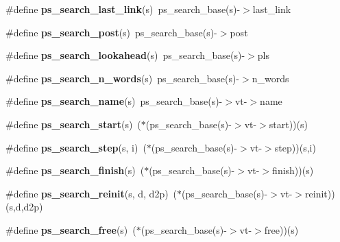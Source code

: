 \begin{DoxyCompactItemize}
\item 
\#define {\bfseries ps\+\_\+search\+\_\+last\+\_\+link}(s)~ps\+\_\+search\+\_\+base(s)-\/$>$last\+\_\+link\label{pocketsphinx__internal_8h_a9ae7d942e4206b4184cc073a87d2dc82}

\item 
\#define {\bfseries ps\+\_\+search\+\_\+post}(s)~ps\+\_\+search\+\_\+base(s)-\/$>$post\label{pocketsphinx__internal_8h_ac8707bfd426dfd0eceb1e57836c0ac91}

\item 
\#define {\bfseries ps\+\_\+search\+\_\+lookahead}(s)~ps\+\_\+search\+\_\+base(s)-\/$>$pls\label{pocketsphinx__internal_8h_a890584ac65d28cd404d66adf631fac7c}

\item 
\#define {\bfseries ps\+\_\+search\+\_\+n\+\_\+words}(s)~ps\+\_\+search\+\_\+base(s)-\/$>$n\+\_\+words\label{pocketsphinx__internal_8h_aaba5c849ae487b5a3fff0210f4687e25}

\item 
\#define {\bfseries ps\+\_\+search\+\_\+name}(s)~ps\+\_\+search\+\_\+base(s)-\/$>$vt-\/$>$name\label{pocketsphinx__internal_8h_a6ff1216eb4c0053ecdfe6096d79f02f7}

\item 
\#define {\bfseries ps\+\_\+search\+\_\+start}(s)~($\ast$(ps\+\_\+search\+\_\+base(s)-\/$>$vt-\/$>$start))(s)\label{pocketsphinx__internal_8h_ac905db8dfa65727e787c44f40d80239c}

\item 
\#define {\bfseries ps\+\_\+search\+\_\+step}(s,  i)~($\ast$(ps\+\_\+search\+\_\+base(s)-\/$>$vt-\/$>$step))(s,i)\label{pocketsphinx__internal_8h_a3e3be8540f1e419fe4dfa1a063c4e8be}

\item 
\#define {\bfseries ps\+\_\+search\+\_\+finish}(s)~($\ast$(ps\+\_\+search\+\_\+base(s)-\/$>$vt-\/$>$finish))(s)\label{pocketsphinx__internal_8h_a52d4cf988efa2211c86a2168de346032}

\item 
\#define {\bfseries ps\+\_\+search\+\_\+reinit}(s,  d,  d2p)~($\ast$(ps\+\_\+search\+\_\+base(s)-\/$>$vt-\/$>$reinit))(s,d,d2p)\label{pocketsphinx__internal_8h_a071483ece6369091cc50334f5be1124b}

\item 
\#define {\bfseries ps\+\_\+search\+\_\+free}(s)~($\ast$(ps\+\_\+search\+\_\+base(s)-\/$>$vt-\/$>$free))(s)\label{pocketsphinx__internal_8h_ac5475853d99524bb4c933c42df58118b}


\end{DoxyCompactItemize}

